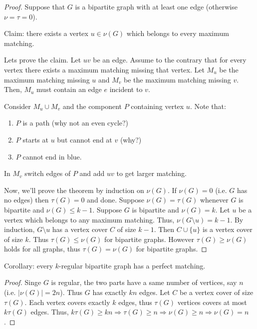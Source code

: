 \documentclass[12pt,a4paper]{article} \usepackage{fontspec}
\begin{document}
\begin{proof} Suppose that \(G\) is a bipartite graph with at least one edge
(otherwise \(\nu = \tau = 0\)).

  Claim: there exists a vertex \(u \in \nu(G)\) which belongs to every maximum
matching.

  Lets prove the claim.  Let \(uv\) be an edge.  Assume to the contrary that for
every vertex there exists a maximum matching missing that vertex.  Let \(M_u\)
be the maximum matching missing \(u\) and \(M_v\) be the maximum matching
missing \(v\).  Then, \(M_u\) must contain an edge \(e\) incident to \(v\).

  Consider \(M_u \cup M_v\) and the component \(P\) containing vertex \(u\).
Note that: \begin{enumerate} \item \(P\) is a path (why not an even cycle?)
\item \(P\) starts at \(u\) but cannot end at \(v\) (why?) \item \(P\) cannot
end in blue.  \end{enumerate} In \(M_v\) switch edges of \(P\) and add \(uv\) to
get larger matching.

  Now, we'll prove the theorem by induction on \(\nu(G)\).  If \(\nu(G)=0\)
(i.e. \(G\) has no edges) then \(\tau(G)=0\) and done.  Suppose \(\nu(G) =
\tau(G)\) whenever \(G\) is bipartite and \(\nu(G) \leq k - 1\).  Suppose \(G\)
is bipartite and \(\nu(G) = k\).  Let \(u\) be a vertex which belongs to any
maximum matching.  Thus, \(\nu(G\setminus u) = k - 1\).  By induction,
\(G\setminus u\) has a vertex cover \(C\) of size \(k - 1\).  Then \(C \cup
\{u\}\) is a vertex cover of size \(k\).  Thus \(\tau(G) \leq \nu(G)\) for
bipartite graphs.  However \(\tau(G) \geq \nu(G)\) holds for all graphs, thus
\(\tau(G) = \nu(G)\) for bipartite graphs.  \end{proof}

Corollary: every \(k\)-regular bipartite graph has a perfect matching.
\begin{proof} Singe \(G\) is regular, the two parts have a same number of
vertices, say \(n\) (i.e. \(|\nu(G)|=2n\)).  Thus \(G\) has exactly \(kn\)
edges.  Let \(C\) be a vertex cover of size \(\tau(G)\).  Each vertex covers
exactly \(k\) edges, thus \(\tau(G)\) vertices covers at most \(k \tau(G)\)
edges.  Thus, \(k \tau(G) \geq k n \Rightarrow \tau(G) \geq n \Rightarrow \nu(G)
\geq n \Rightarrow \nu(G) = n\).  \end{proof}
\end{document}
